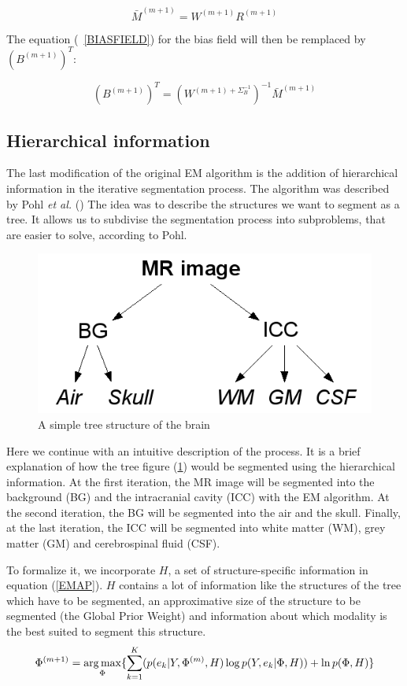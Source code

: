   \begin{equation*}
  \bar{M}^{(m+1)} = W^{(m+1)}R^{(m+1)}
  \end{equation*}

The equation (~\ref{BIASFIELD}) for the bias field will then be remplaced by $(B^{(m+1)})^T$:

  \begin{equation*}
  (B^{(m+1)})^T = (W^{(m+1) + \Sigma_B^{-1}})^{-1}\bar{M}^{(m+1)}
  \end{equation*}

%
\subsection{Hierarchical information}\label{Structure}
The last modification of the original EM algorithm is the addition of hierarchical information in the iterative segmentation process. The algorithm was described by Pohl \textit{et al.} (\cite{11}) The idea was to describe the structures we want to segment as a tree. It allows us to subdivise the segmentation process into subproblems, that are easier to solve, according to Pohl.
  
  \begin{figure}[ht]\centering
  \includegraphics[width=.4\textwidth]{Images/Graphics/treeStructure.png}
  \caption{A simple tree structure of the brain}\label{fig:treeStructure}
  \end{figure}
  
Here we continue with an intuitive description of the process. It is a brief explanation of how the tree figure (\ref{fig:treeStructure}) would be segmented using the hierarchical information. At the first iteration, the MR image will be segmented into the background (BG) and the intracranial cavity (ICC) with the EM algorithm. At the second iteration, the BG will be segmented into the air and the skull. Finally, at the last iteration, the ICC will be segmented into white matter (WM), grey matter (GM) and cerebrospinal fluid (CSF).

To formalize it, we incorporate $H$, a set of structure-specific information in equation (\ref{EMAP}). $H$ contains a lot of information like the structures of the tree which have to be segmented, an approximative size of the structure to be segmented (the Global Prior Weight) and information about which modality is the best suited to segment this structure.
\begin{equation*}
 \Phi^{(m+1)}=\operatorname*{arg\,max}_\Phi \{\sum_{k=1}^K   (p(e_{k}|Y,\Phi^{(m)},H)\operatorname*{log} p(Y,e_{k}|\Phi,H)) + \operatorname*{ln} p(\Phi ,H) \} \\
\end{equation*}
 
